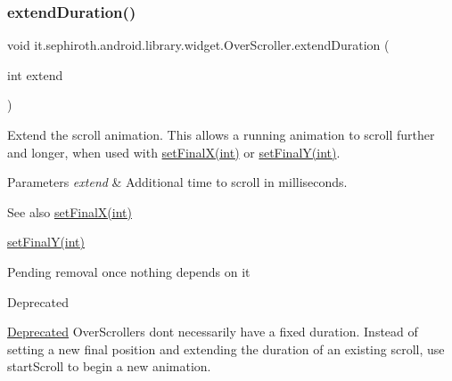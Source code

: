 \subsubsection{\texorpdfstring{extend\+Duration()}{extendDuration()}}
{\footnotesize\ttfamily void it.\+sephiroth.\+android.\+library.\+widget.\+Over\+Scroller.\+extend\+Duration (\begin{DoxyParamCaption}\item[{int}]{extend }\end{DoxyParamCaption})}

Extend the scroll animation. This allows a running animation to scroll further and longer, when used with \hyperlink{classit_1_1sephiroth_1_1android_1_1library_1_1widget_1_1_over_scroller_a6cc75f4f959d10d938d62bbc2da639ed}{set\+Final\+X(int)} or \hyperlink{classit_1_1sephiroth_1_1android_1_1library_1_1widget_1_1_over_scroller_a9ef2e1e21a97339f297abd812518828e}{set\+Final\+Y(int)}.


\begin{DoxyParams}{Parameters}
{\em extend} & Additional time to scroll in milliseconds. \\
\hline
\end{DoxyParams}
\begin{DoxySeeAlso}{See also}
\hyperlink{classit_1_1sephiroth_1_1android_1_1library_1_1widget_1_1_over_scroller_a6cc75f4f959d10d938d62bbc2da639ed}{set\+Final\+X(int)} 

\hyperlink{classit_1_1sephiroth_1_1android_1_1library_1_1widget_1_1_over_scroller_a9ef2e1e21a97339f297abd812518828e}{set\+Final\+Y(int)}
\end{DoxySeeAlso}
Pending removal once nothing depends on it \begin{DoxyRefDesc}{Deprecated}
\item[\hyperlink{deprecated__deprecated000003}{Deprecated}]Over\+Scrollers don\textquotesingle{}t necessarily have a fixed duration. Instead of setting a new final position and extending the duration of an existing scroll, use start\+Scroll to begin a new animation. \end{DoxyRefDesc}
\mbox{\label{classit_1_1sephiroth_1_1android_1_1library_1_1widget_1_1_over_scroller_a6e941efde417ea0d739fd9d393a4a859}} 
